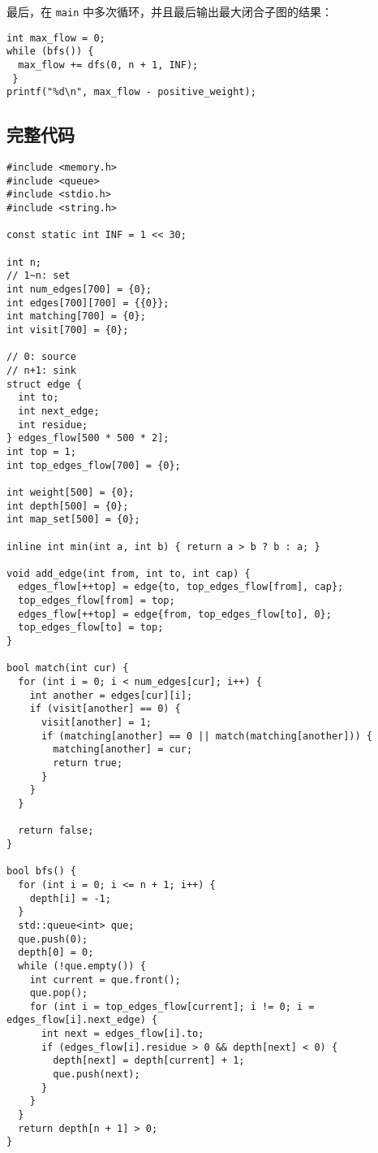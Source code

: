 \documentclass[11pt]{article}
\begin{document}
最后，在 \texttt{main} 中多次循环，并且最后输出最大闭合子图的结果：

\begin{verbatim}
int max_flow = 0;
while (bfs()) {
  max_flow += dfs(0, n + 1, INF);
 }
printf("%d\n", max_flow - positive_weight);
\end{verbatim}

\subsection{完整代码}
\label{sec:orgad8a381}
\begin{verbatim}
#include <memory.h>
#include <queue>
#include <stdio.h>
#include <string.h>

const static int INF = 1 << 30;

int n;
// 1~n: set
int num_edges[700] = {0};
int edges[700][700] = {{0}};
int matching[700] = {0};
int visit[700] = {0};

// 0: source
// n+1: sink
struct edge {
  int to;
  int next_edge;
  int residue;
} edges_flow[500 * 500 * 2];
int top = 1;
int top_edges_flow[700] = {0};

int weight[500] = {0};
int depth[500] = {0};
int map_set[500] = {0};

inline int min(int a, int b) { return a > b ? b : a; }

void add_edge(int from, int to, int cap) {
  edges_flow[++top] = edge{to, top_edges_flow[from], cap};
  top_edges_flow[from] = top;
  edges_flow[++top] = edge{from, top_edges_flow[to], 0};
  top_edges_flow[to] = top;
}

bool match(int cur) {
  for (int i = 0; i < num_edges[cur]; i++) {
    int another = edges[cur][i];
    if (visit[another] == 0) {
      visit[another] = 1;
      if (matching[another] == 0 || match(matching[another])) {
        matching[another] = cur;
        return true;
      }
    }
  }

  return false;
}

bool bfs() {
  for (int i = 0; i <= n + 1; i++) {
    depth[i] = -1;
  }
  std::queue<int> que;
  que.push(0);
  depth[0] = 0;
  while (!que.empty()) {
    int current = que.front();
    que.pop();
    for (int i = top_edges_flow[current]; i != 0; i = edges_flow[i].next_edge) {
      int next = edges_flow[i].to;
      if (edges_flow[i].residue > 0 && depth[next] < 0) {
        depth[next] = depth[current] + 1;
        que.push(next);
      }
    }
  }
  return depth[n + 1] > 0;
}


\end{verbatim}
\end{document}
